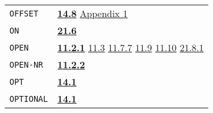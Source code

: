 \documentclass[a4paper]{scrbook}
\begin{document}
\begin{longtable}[]{@{}ll@{}}
\begin{minipage}[t]{0.24\columnwidth}
\texttt{OFFSET}\strut
\end{minipage} & \begin{minipage}[t]{0.70\columnwidth}\raggedright\strut
\textbf{\href{14-data-type-declarations.md\#148-offset}{14.8}}
\href{appendix-1-a-look-inside.md\#appendix-1-a-look-inside}{Appendix 1}\strut
\end{minipage}\tabularnewline
\begin{minipage}[t]{0.24\columnwidth}\raggedright\strut
\texttt{ON}\strut
\end{minipage} & \begin{minipage}[t]{0.70\columnwidth}\raggedright\strut
\textbf{\href{21-interrupts.md\#216-other-subrs}{21.6}}\strut
\end{minipage}\tabularnewline
\begin{minipage}[t]{0.24\columnwidth}\raggedright\strut
\texttt{OPEN}\strut
\end{minipage} & \begin{minipage}[t]{0.70\columnwidth}\raggedright\strut
\textbf{\href{11-input-output.md\#1121-open}{11.2.1}} \href{11-input-output.md\#113-end-of-file-routine}{11.3}
\href{11-input-output.md\#1177-reset}{11.7.7} \href{11-input-output.md\#119-internal-channels}{11.9}
\href{11-input-output.md\#1110-the-net-device-the-arpa-network}{11.10}
\href{21-interrupts.md\#2181-char-received}{21.8.1}\strut
\end{minipage}\tabularnewline
\begin{minipage}[t]{0.24\columnwidth}\raggedright\strut
\texttt{OPEN-NR}\strut
\end{minipage} & \begin{minipage}[t]{0.70\columnwidth}\raggedright\strut
\textbf{\href{11-input-output.md\#1122-open-nr}{11.2.2}}\strut
\end{minipage}\tabularnewline
\begin{minipage}[t]{0.24\columnwidth}\raggedright\strut
\texttt{OPT}\strut
\end{minipage} & \begin{minipage}[t]{0.70\columnwidth}\raggedright\strut
\textbf{\href{14-data-type-declarations.md\#141-patterns}{14.1}}\strut
\end{minipage}\tabularnewline
\begin{minipage}[t]{0.24\columnwidth}\raggedright\strut
\texttt{OPTIONAL}\strut
\end{minipage} & \begin{minipage}[t]{0.70\columnwidth}\raggedright\strut
\textbf{\href{14-data-type-declarations.md\#141-patterns}{14.1}}\strut

\end{minipage}
\end{longtable}
\end{document}
